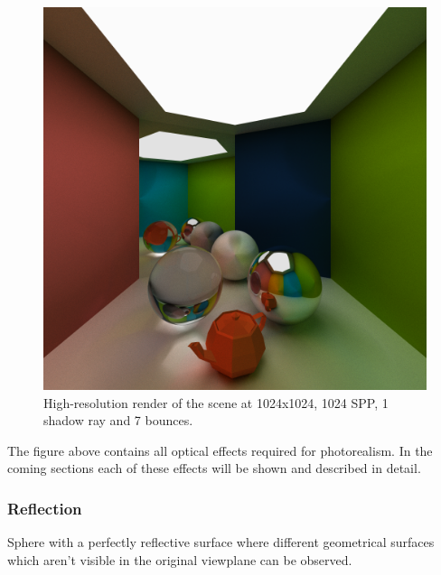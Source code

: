 \documentclass[a4paper, twocolumn]{article}
\begin{document}
            \begin{figure}[H]
                \centering
                \includegraphics[width=\linewidth]{share/new_render.png}
                \caption{High-resolution render of the scene at 1024x1024, 1024 SPP, 1 shadow ray and 7 bounces.}
                \label{fig:render}
            \end{figure}

            The figure above contains all optical effects required for photorealism. In the coming sections each of these effects will be shown and described in detail.

            \subsubsection*{Reflection}

            Sphere with a perfectly reflective surface where different geometrical surfaces which aren't visible in the original viewplane can be observed. 
\end{document}
